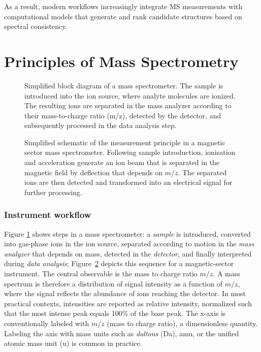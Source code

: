 As a result, modern workflows increasingly integrate MS measurements with computational models that generate and rank candidate structures based on spectral consistency.


\section{Principles of Mass Spectrometry}


\begin{figure}[H]
    \centering
    \resizebox{0.9\textwidth}{!}{}
    \caption[Simplified block diagram of a mass spectrometer]{
        Simplified block diagram of a mass spectrometer. 
        The sample is introduced into the ion source, where analyte molecules are ionized. 
        The resulting ions are separated in the mass analyzer according to their mass-to-charge ratio (m/z), detected by the detector, and subsequently processed in the data analysis step. \cite{wikibooks-ms-flowchart}
        }
    \label{fig:ms-flow}
\end{figure}

\begin{figure}[H]
    \centering
    \resizebox{0.9\textwidth}{!}{}
    \caption[Simplified schematic of MS measurement principle]{
        Simplified schematic of the measurement principle in a magnetic sector mass spectrometer. 
        Following sample introduction, ionisation and acceleration generate an ion beam that is separated in the magnetic field by deflection that depends on $m/z$. 
        The separated ions are then detected and transformed into an electrical signal for further processing. \cite{chemguide}
    }
    \label{fig:ms-schematic}
\end{figure}



\subsubsection{Instrument workflow}

Figure \ref{fig:ms-flow} shows steps in a mass spectrometer: a \emph{sample} is introduced, converted into gas-phase ions in the ion source, separated according to motion in the \emph{mass analyzer} that depends on mass, detected in the \emph{detector}, and finally interpreted during \emph{data analysis}; Figure~\ref{fig:ms-schematic} depicts this sequence for a magnetic-sector instrument. 
The central observable is the mass to charge ratio $m/z$. 
A mass spectrum is therefore a distribution of signal intensity as a function of $m/z$, where the signal reflects the abundance of ions reaching the detector. \cite[p.~1566]{Murray2013}
In most practical contexts, intensities are reported as relative intensity, normalized such that the most intense peak equals 100\% of the base peak.  \cite[p.~1550]{Murray2013}
The x-axis is conventionally labeled with $m/z$ (mass to charge ratio), a dimensionless quantity.
Labeling the axis with mass units such as \emph{daltons} (Da), amu, or the unified atomic mass unit (u) is common in practice. \cite[p.~1516]{Murray2013}

